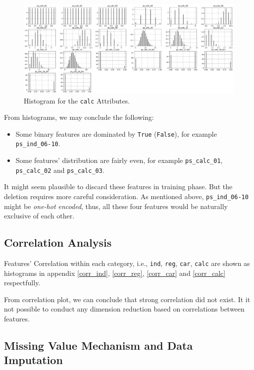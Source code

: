 \documentclass{standalone}
\begin{document}
\begin{figure}[!ht]
\centering
\includegraphics[width=\textwidth]{fig/calc_col.pdf}
\caption{Histogram for the \lstinline{calc} Attributes.}
\label{hist_calc}
\end{figure}

From histograms, we may conclude the following:
\begin{itemize}
\item Some binary features are dominated by \lstinline{True} (\lstinline{False}), for example \lstinline{ps_ind_06-10}.
\item Some features' distribution are fairly even, for example \lstinline{ps_calc_01}, \lstinline{ps_calc_02} and \lstinline{ps_calc_03}.
\end{itemize}

It might seem plausible to discard these features in training phase. But the deletion requires more careful consideration. As mentioned above, \lstinline{ps_ind_06-10} might be \emph{one-hot encoded}, thus, all these four features would be naturally exclusive of each other.

\subsection{Correlation Analysis}

Features' Correlation within each category, i.e., \lstinline{ind}, \lstinline{reg}, \lstinline{car}, \lstinline{calc} are shown as histograms in appendix \cref{corr_ind}, \cref{corr_reg}, \cref{corr_car} and \cref{corr_calc} respectfully.



From correlation plot, we can conclude that strong correlation did not exist.
It it not possible to conduct any dimension reduction based on correlations
between features.

\subsection{Missing Value Mechanism and Data Imputation}
\end{document}
